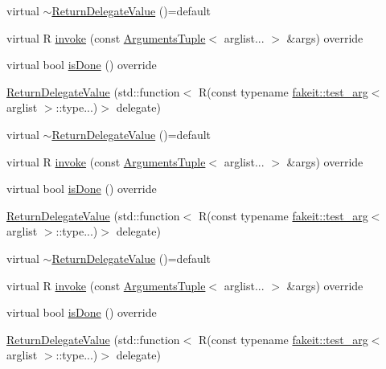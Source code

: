 \begin{DoxyCompactItemize}
\item 
virtual \mbox{\hyperlink{structfakeit_1_1ReturnDelegateValue_aa99d3b17fdae68f84cbc38c0acaee3c7}{$\sim$\+Return\+Delegate\+Value}} ()=default
\item 
virtual R \mbox{\hyperlink{structfakeit_1_1ReturnDelegateValue_a6f3758c13895d1fc748357f94983404a}{invoke}} (const \mbox{\hyperlink{namespacefakeit_a476a37a598825e1b5dd67b3a176491a1}{Arguments\+Tuple}}$<$ arglist... $>$ \&args) override
\item 
virtual bool \mbox{\hyperlink{structfakeit_1_1ReturnDelegateValue_ac6c33b7d5fff3fedeec91a4780924b84}{is\+Done}} () override
\item 
\mbox{\hyperlink{structfakeit_1_1ReturnDelegateValue_a889666c123cb4e75bee7771b9d9433a5}{Return\+Delegate\+Value}} (std\+::function$<$ R(const typename \mbox{\hyperlink{structfakeit_1_1test__arg}{fakeit\+::test\+\_\+arg}}$<$ arglist $>$\+::type...)$>$ delegate)
\item 
virtual \mbox{\hyperlink{structfakeit_1_1ReturnDelegateValue_aa99d3b17fdae68f84cbc38c0acaee3c7}{$\sim$\+Return\+Delegate\+Value}} ()=default
\item 
virtual R \mbox{\hyperlink{structfakeit_1_1ReturnDelegateValue_a6f3758c13895d1fc748357f94983404a}{invoke}} (const \mbox{\hyperlink{namespacefakeit_a476a37a598825e1b5dd67b3a176491a1}{Arguments\+Tuple}}$<$ arglist... $>$ \&args) override
\item 
virtual bool \mbox{\hyperlink{structfakeit_1_1ReturnDelegateValue_ac6c33b7d5fff3fedeec91a4780924b84}{is\+Done}} () override
\item 
\mbox{\hyperlink{structfakeit_1_1ReturnDelegateValue_a889666c123cb4e75bee7771b9d9433a5}{Return\+Delegate\+Value}} (std\+::function$<$ R(const typename \mbox{\hyperlink{structfakeit_1_1test__arg}{fakeit\+::test\+\_\+arg}}$<$ arglist $>$\+::type...)$>$ delegate)
\item 
virtual \mbox{\hyperlink{structfakeit_1_1ReturnDelegateValue_aa99d3b17fdae68f84cbc38c0acaee3c7}{$\sim$\+Return\+Delegate\+Value}} ()=default
\item 
virtual R \mbox{\hyperlink{structfakeit_1_1ReturnDelegateValue_a6f3758c13895d1fc748357f94983404a}{invoke}} (const \mbox{\hyperlink{namespacefakeit_a476a37a598825e1b5dd67b3a176491a1}{Arguments\+Tuple}}$<$ arglist... $>$ \&args) override
\item 
virtual bool \mbox{\hyperlink{structfakeit_1_1ReturnDelegateValue_ac6c33b7d5fff3fedeec91a4780924b84}{is\+Done}} () override
\item 
\mbox{\hyperlink{structfakeit_1_1ReturnDelegateValue_a889666c123cb4e75bee7771b9d9433a5}{Return\+Delegate\+Value}} (std\+::function$<$ R(const typename \mbox{\hyperlink{structfakeit_1_1test__arg}{fakeit\+::test\+\_\+arg}}$<$ arglist $>$\+::type...)$>$ delegate)

\end{DoxyCompactItemize}
